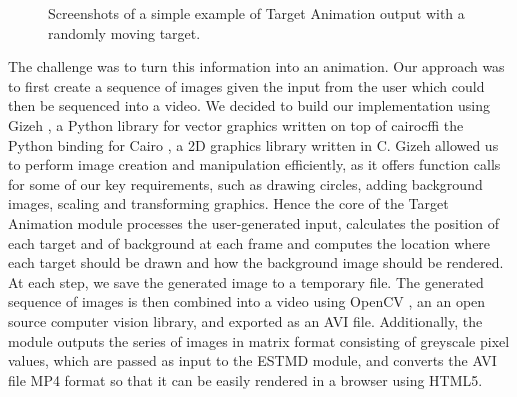 \documentclass[a4paper,11pt]{article}
\begin{document}
\begin{figure}[H]
\begin{minipage}{0.2\textwidth}
\end{minipage}
\begin{minipage}{0.2\textwidth}
\end{minipage}
\caption{Screenshots of a simple example of Target Animation output with a randomly moving target.}
\label{target_animation_example}
\end{figure}

The challenge was to turn this information into an animation. Our approach was to first create a sequence of images given the input from the user which could then be sequenced into a video. We decided to build our implementation using Gizeh \cite{gizeh}, a Python library for vector graphics written on top of cairocffi \cite{cairocffi} the Python binding for Cairo \cite{cairo}, a 2D graphics library written in C. Gizeh allowed us to perform image creation and manipulation efficiently, as it offers function calls for some of our key requirements, such as drawing circles, adding background images, scaling and transforming graphics. Hence the core of the Target Animation module processes the user-generated input, calculates the position of each target and of background at each frame and computes the location where each target should be drawn and how the background image should be rendered. At each step, we save the generated image to a temporary file. The generated sequence of images is then combined into a video using OpenCV \cite{opencv}, an an open source computer vision library, and exported as an AVI file. Additionally, the module outputs the series of images in matrix format consisting of greyscale pixel values, which are passed as input to the ESTMD module, and converts the AVI file MP4 format so that it can be easily rendered in a browser using HTML5.
\end{document}
